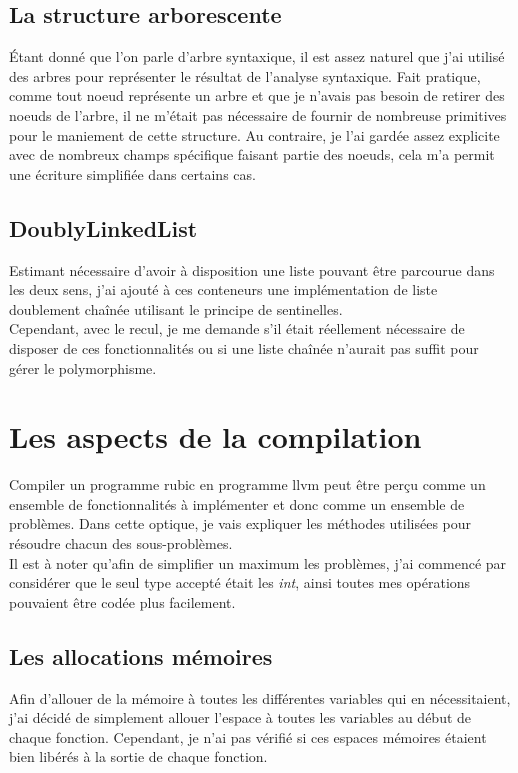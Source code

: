 \documentclass[12pt]{article}
\begin{document}
\subsection{La structure arborescente}
Étant donné que l'on parle d'arbre syntaxique, il est assez naturel que j'ai
utilisé des arbres pour représenter le résultat de l'analyse syntaxique. Fait
pratique, comme tout noeud représente un arbre et que je n'avais pas besoin
de retirer des noeuds de l'arbre, il ne m'était pas nécessaire de fournir
de nombreuse primitives pour le maniement de cette structure. Au contraire,
je l'ai gardée assez explicite avec de nombreux champs spécifique faisant
partie des noeuds, cela m'a permit une écriture simplifiée dans certains cas.

\subsection{DoublyLinkedList}
Estimant nécessaire d'avoir à disposition une liste pouvant être parcourue
dans les deux sens, j'ai ajouté à ces conteneurs une implémentation de liste
doublement chaînée utilisant le principe de sentinelles.\\

Cependant, avec le recul, je me demande s'il était réellement nécessaire de
disposer de ces fonctionnalités ou si une liste chaînée n'aurait pas suffit
pour gérer le polymorphisme.

\section{Les aspects de la compilation}
Compiler un programme rubic en programme llvm peut être perçu comme un
ensemble de fonctionnalités à implémenter et donc comme un ensemble de
problèmes. Dans cette optique, je vais expliquer les méthodes utilisées pour
résoudre chacun des sous-problèmes.\\

Il est à noter qu'afin de simplifier un maximum les problèmes, j'ai commencé
par considérer que le seul type accepté était les {\em int}, ainsi toutes mes
opérations pouvaient être codée plus facilement.

\subsection{Les allocations mémoires}
Afin d'allouer de la mémoire à toutes les différentes variables qui en
nécessitaient, j'ai décidé de simplement allouer l'espace à toutes les
variables au début de chaque fonction. Cependant, je n'ai pas vérifié si
ces espaces mémoires étaient bien libérés à la sortie de chaque fonction.
\end{document}
